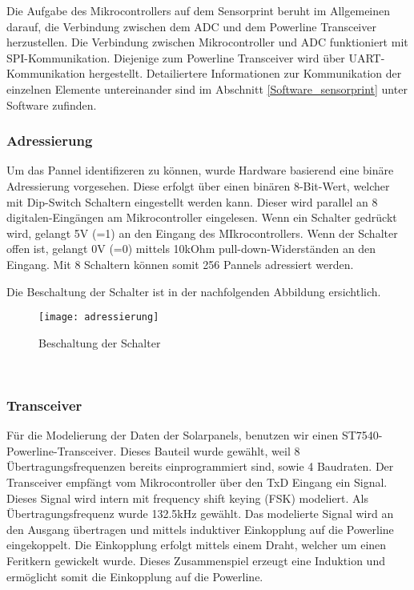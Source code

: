 Die Aufgabe des Mikrocontrollers auf dem Sensorprint beruht im Allgemeinen darauf, die Verbindung zwischen dem ADC und dem Powerline Transceiver herzustellen. Die Verbindung zwischen Mikrocontroller und ADC funktioniert mit SPI-Kommunikation. Diejenige zum Powerline Transceiver wird über UART-Kommunikation hergestellt. Detailiertere Informationen zur Kommunikation der einzelnen Elemente untereinander sind im Abschnitt \ref{Software_sensorprint} unter Software zufinden.


\clearpage

\subsubsection{Adressierung}
Um das Pannel identifizeren zu können, wurde Hardware basierend eine binäre Adressierung vorgesehen. Diese erfolgt über einen binären 8-Bit-Wert, welcher mit Dip-Switch Schaltern eingestellt werden kann. Dieser wird parallel an 8 digitalen-Eingängen am Mikrocontroller eingelesen. Wenn ein Schalter gedrückt wird, gelangt 5V (=1) an den Eingang des MIkrocontrollers. Wenn der Schalter offen ist, gelangt 0V (=0) mittels 10kOhm pull-down-Widerständen an den Eingang. Mit 8 Schaltern können somit 256 Pannels adressiert werden. 

Die Beschaltung der Schalter ist in der nachfolgenden Abbildung ersichtlich.

\begin{figure}[h]
\centering
\texttt{[image: adressierung]}
\caption{Beschaltung der Schalter}
\end{figure}

\
\

\subsubsection{Transceiver}
Für die Modelierung der Daten der Solarpanels, benutzen wir einen ST7540-Powerline-Transceiver. Dieses Bauteil wurde gewählt, weil 8 Übertragungsfrequenzen bereits einprogrammiert sind, sowie 4 Baudraten. Der Transceiver empfängt vom Mikrocontroller über den TxD Eingang ein Signal. Dieses Signal wird intern mit frequency shift keying (FSK) modeliert. Als Übertragungsfrequenz wurde 132.5kHz gewählt. Das modelierte Signal wird an den Ausgang übertragen und mittels induktiver Einkopplung auf die Powerline eingekoppelt. Die Einkopplung erfolgt mittels einem Draht, welcher um einen Feritkern gewickelt wurde. Dieses Zusammenspiel erzeugt eine Induktion und ermöglicht somit die Einkopplung auf die Powerline.

